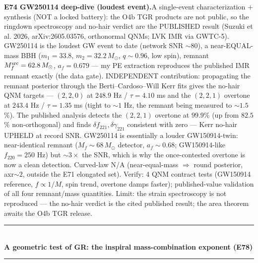 \documentclass[10pt]{article}
\newcommand{\entry}[2]{\vspace{5pt}\noindent\textbf{#1}\quad #2\par}
\newcommand{\grouphead}[1]{\vspace{9pt}\noindent\rule{\linewidth}{0.4pt}\\[-2pt]{\small\textbf{#1}}\\[-4pt]\rule{\linewidth}{0.4pt}\par\vspace{2pt}}
\begin{document}
\entry{E74 GW250114 deep-dive (loudest event).}{A single-event characterization $+$ synthesis (NOT a
locked battery): the O4b TGR products are not public, so the ringdown spectroscopy and no-hair verdict
are the PUBLISHED result (Suzuki et al. 2026, arXiv:2605.03576, orthonormal QNMs; LVK IMR via GWTC-5).
GW250114 is the loudest GW event to date (network SNR $\sim80$), a near-EQUAL-mass BBH ($m_1=33.8$,
$m_2=32.2\,M_\odot$, $q\sim0.96$, low spin), remnant $M_f^{\rm src}=62.8\,M_\odot$, $a_f=0.679$ --- my
PE extraction reproduces the published IMR remnant exactly (the data gate). INDEPENDENT contribution:
propagating the remnant posterior through the Berti--Cardoso--Will Kerr fits gives the no-hair QNM
targets --- $(2,2,0)$ at $248.9$ Hz / $\tau=4.10$ ms and the $(2,2,1)$ overtone at $243.4$ Hz /
$\tau=1.35$ ms (tight to $\sim1$ Hz, the remnant being measured to $\sim1.5$\%). The published analysis
detects the $(2,2,1)$ overtone at $99.9$\% (up from $82.5$\% non-orthogonal) and finds
$\delta f_{221},\delta\gamma_{221}$ consistent with zero --- Kerr no-hair UPHELD at record SNR.
GW250114 is essentially a louder GW150914-twin: near-identical remnant ($M_f\sim68\,M_\odot$ detector,
$a_f\sim0.68$; GW150914-like $f_{220}=250$ Hz) but $\sim3\times$ the SNR, which is why the once-contested
overtone is now a clean detection. Curved-law N/A (near-equal-mass $\Rightarrow$ round posterior,
axr$\sim2$, outside the E71 elongated set). Verify: 4 QNM contract tests (GW150914 reference,
$f\propto1/M$, spin trend, overtone damps faster); published-value validation of all four remnant/mass
quantities. Limit: the strain spectroscopy is not reproduced --- the no-hair verdict is the cited
published result; the area theorem awaits the O4b TGR release.}

\grouphead{A geometric test of GR: the inspiral mass-combination exponent (E78)}
\end{document}
